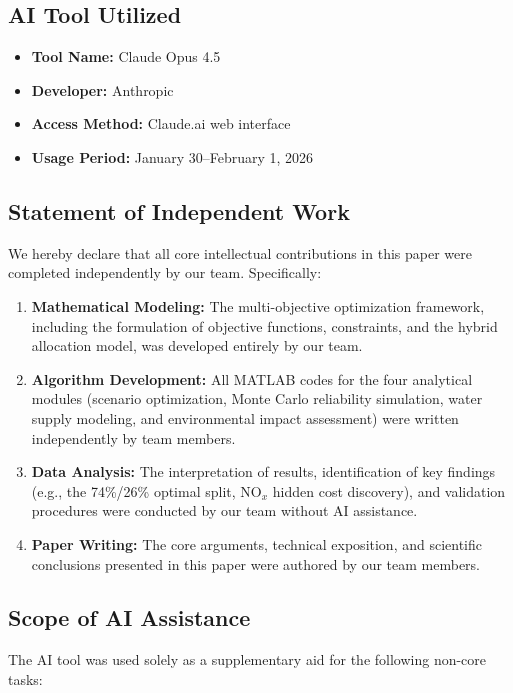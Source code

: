 \documentclass[12pt]{article}
\begin{document}
\subsection*{AI Tool Utilized}
\begin{itemize}[leftmargin=2em, itemsep=0pt]
	\item \textbf{Tool Name:} Claude Opus 4.5
	\item \textbf{Developer:} Anthropic
	\item \textbf{Access Method:} Claude.ai web interface
	\item \textbf{Usage Period:} January 30--February 1, 2026
\end{itemize}

\subsection*{Statement of Independent Work}
We hereby declare that all core intellectual contributions in this paper were completed independently by our team. Specifically:

\begin{enumerate}[leftmargin=2em, itemsep=2pt]
	\item \textbf{Mathematical Modeling:} The multi-objective optimization framework, including the formulation of objective functions, constraints, and the hybrid allocation model, was developed entirely by our team.
	
	\item \textbf{Algorithm Development:} All MATLAB codes for the four analytical modules (scenario optimization, Monte Carlo reliability simulation, water supply modeling, and environmental impact assessment) were written independently by team members.
	
	\item \textbf{Data Analysis:} The interpretation of results, identification of key findings (e.g., the 74\%/26\% optimal split, NO$_x$ hidden cost discovery), and validation procedures were conducted by our team without AI assistance.
	
	\item \textbf{Paper Writing:} The core arguments, technical exposition, and scientific conclusions presented in this paper were authored by our team members.
\end{enumerate}

\subsection*{Scope of AI Assistance}
The AI tool was used solely as a supplementary aid for the following non-core tasks:
\end{document}
